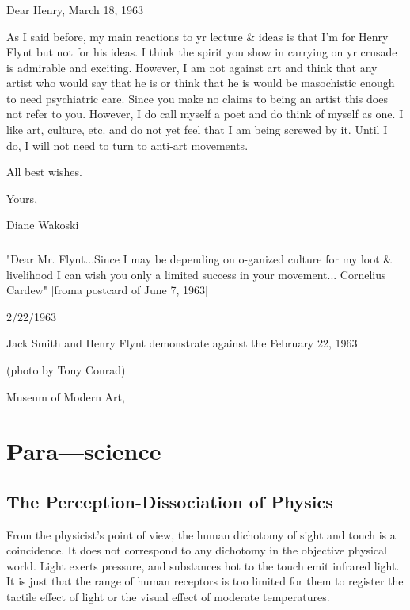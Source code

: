 \documentclass[10pt,twoside]{memoir}
\begin{document}
\begin{enumerate}
{\begin{enumerate}

\section{}

Dear Henry, March 18, 1963 


As I said before, my main reactions to yr lecture & ideas is that I'm for 
Henry Flynt but not for his ideas. I think the spirit you show in carrying on 
yr crusade is admirable and exciting. However, I am not against art and think 
that any artist who would say that he is or think that he is would be 
masochistic enough to need psychiatric care. Since you make no claims to 
being an artist this does not refer to you. However, I do call myself a poet 
and do think of myself as one. I like art, culture, etc. and do not yet feel 
that I am being screwed by it. Until I do, I will not need to turn to anti-art 
movements. 

All best wishes. 

Yours, 

Diane Wakoski 

\section{}

"Dear Mr. Flynt...Since I may be depending on o-ganized culture for my 
loot & livelihood I can wish you only a limited success in your movement... 
Cornelius Cardew" [froma postcard of June 7, 1963] 


\clearpage

{
2/22/1963 


Jack Smith and Henry Flynt demonstrate against the 
February 22, 1963 


(photo by Tony Conrad) 

Museum of Modern Art, 
}
\clearpage


\part{Para---science}


\chapter{The Perception-Dissociation of Physics}


From the physicist's point of view, the human dichotomy of sight and 
touch is a coincidence. It does not correspond to any dichotomy in the 
objective physical world. Light exerts pressure, and substances hot to the 
touch emit infrared light. It is just that the range of human receptors is too 
limited for them to register the tactile effect of light or the visual effect of 
moderate temperatures. 


\end{enumerate}}
\end{enumerate}
\end{document}
